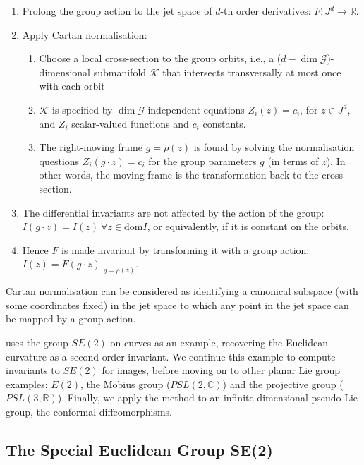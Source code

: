 \documentclass[review,onefignum,onetabnum]{siamonline190516}
\begin{document}
\begin{enumerate}
\item Prolong the group action to the jet space of $d$-th order derivatives: $F: J^d \to \mathbb{R}$. 
\item Apply Cartan normalisation:
    \begin{enumerate}
    \item Choose a local cross-section to the group orbits, i.e., a ($d - \dim \mathcal{G}$)-dimensional submanifold $\mathcal{K}$ that intersects transversally at most once with each orbit
    \item $\mathcal{K}$ is specified by $\dim \mathcal{G}$ independent equations $Z_i (z) = c_i$, for $z \in J^d$,  and $Z_i$ scalar-valued functions and $c_i$ constants.
    \item The right-moving frame $g = \rho(z)$ is found by solving the normalisation questions $Z_i (g \cdot z) = c_i$ for the group parameters $g$ (in terms of $z$). In other words, the moving frame is the transformation back to the cross-section.
    \end{enumerate}
\item The differential invariants are not affected by the action of the group: $I(g \cdot z) = I(z) \: \forall z \in \mathrm{dom} I$, or equivalently, if it is constant on the orbits. 
\item Hence $F$ is made invariant by transforming it with a group action: $I(z) = F(g \cdot z) |_{g=\rho(z)}$.  
\end{enumerate}

Cartan normalisation can be considered as identifying a canonical subspace (with some coordinates fixed) in the jet space to which any point in the jet space can be mapped by a group action.

\citet{OlverCIT} uses the group $SE(2)$ on curves as an example, recovering the Euclidean curvature as a second-order invariant. We continue this example to compute invariants to $SE(2)$ for images, before moving on to other planar Lie group examples: $E(2)$, the M\"obius group ($PSL(2,\mathbb{C})$) and the projective group ($PSL(3,\mathbb{R})$). Finally, we apply the method to an infinite-dimensional pseudo-Lie group, the conformal diffeomorphisms.

\subsection{The Special Euclidean Group SE(2)}
\label{sec:SE2}
\end{document}
